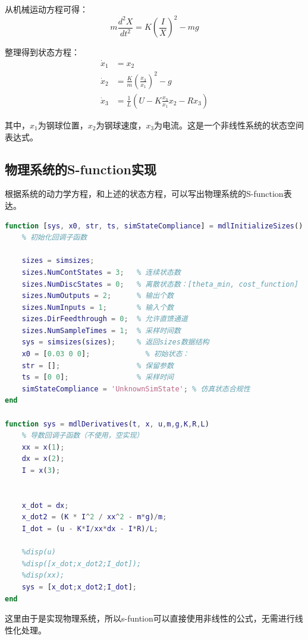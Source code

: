 \documentclass[12pt,a4paper,UTF8]{article}
\begin{document}
从机械运动方程可得：
\begin{equation}
m\frac{d^2X}{dt^2} = K\left(\frac{I}{X}\right)^2 - mg
\end{equation}

整理得到状态方程：
\begin{equation}
\begin{aligned}
\dot{x}_1 &= x_2 \\
\dot{x}_2 &= \frac{K}{m}\left(\frac{x_3}{x_1}\right)^2 - g \\
\dot{x}_3 &= \frac{1}{L}\left(U - K\frac{x_3}{x_1}x_2 - Rx_3\right)
\end{aligned}
\end{equation}

其中，$x_1$为钢球位置，$x_2$为钢球速度，$x_3$为电流。这是一个非线性系统的状态空间表达式。

\newpage
\subsection{物理系统的S-function实现}

根据系统的动力学方程，和上述的状态方程，可以写出物理系统的S-function表达。

\begin{lstlisting}[language=Matlab,caption=物理系统的S-function实现]
function [sys, x0, str, ts, simStateCompliance] = mdlInitializeSizes()
    % 初始化回调子函数
    
    sizes = simsizes;
    sizes.NumContStates = 3;   % 连续状态数
    sizes.NumDiscStates = 0;   % 离散状态数：[theta_min, cost_function]
    sizes.NumOutputs = 2;      % 输出个数
    sizes.NumInputs = 1;       % 输入个数
    sizes.DirFeedthrough = 0;  % 允许直馈通道
    sizes.NumSampleTimes = 1;  % 采样时间数
    sys = simsizes(sizes);     % 返回sizes数据结构
    x0 = [0.03 0 0];             % 初始状态：
    str = [];                  % 保留参数
    ts = [0 0];                % 采样时间
    simStateCompliance = 'UnknownSimState'; % 仿真状态合规性
end

function sys = mdlDerivatives(t, x, u,m,g,K,R,L)
    % 导数回调子函数（不使用，空实现）
    xx = x(1);
    dx = x(2);
    I = x(3);
    

    x_dot = dx;
    x_dot2 = (K * I^2 / xx^2 - m*g)/m;
    I_dot = (u - K*I/xx*dx - I*R)/L;
    
    %disp(u)
    %disp([x_dot;x_dot2;I_dot]);
    %disp(xx);
    sys = [x_dot;x_dot2;I_dot];
end
\end{lstlisting}

这里由于是实现物理系统，所以s-funtion可以直接使用非线性的公式，无需进行线性化处理。
\end{document}
